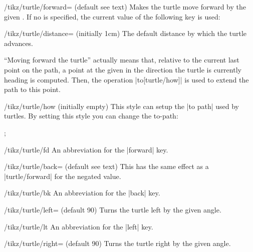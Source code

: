 \begin{key}{/tikz/turtle/forward= (default \normalfont see text)}
  Makes the turtle move forward by the given . If no
   is specified, the current value of the following key
  is used:
  \begin{key}{/tikz/turtle/distance= (initially 1cm)}
    The default distance by which the turtle advances.
  \end{key}
  ``Moving forward the turtle'' actually means that, relative to the
  current last point on the path, a point at the given 
  in the direction the turtle is currently heading is computed. Then,
  the operation |to[turtle/how]| is used to extend the path to this
  point. 
  \begin{stylekey}{/tikz/turtle/how (initially \normalfont empty)}
    This style can setup the |to path| used by turtles. By setting
    this style you can change the to-path: 
\begin{codeexample}[]
\tikz \draw [turtle={how/.style={bend left},home,forward,right,forward}];
\end{codeexample}    
  \end{stylekey}
\end{key}

\begin{key}{/tikz/turtle/fd}
  An abbreviation for the |forward| key.
\end{key}

\begin{key}{/tikz/turtle/back= (default \normalfont see text)}
  This has the same effect as a |turtle/forward| for the negated
   value.
\end{key}

\begin{key}{/tikz/turtle/bk}
  An abbreviation for the |back| key.
\end{key}

\begin{key}{/tikz/turtle/left= (default 90)}
  Turns the turtle left by the given angle. 
\end{key}

\begin{key}{/tikz/turtle/lt}
  An abbreviation for the |left| key.
\end{key}

\begin{key}{/tikz/turtle/right= (default 90)}
  Turns the turtle right by the given angle. 
\end{key}

